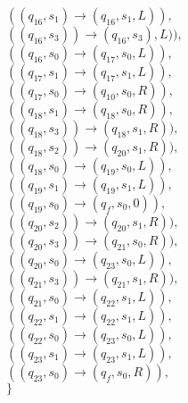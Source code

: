 \documentclass{article} %
\begin{document}
\begin{center}
\begin{varwidth}{\textwidth}
\begin{tasks}[label={},label-width={1cm}]
                \task
                $((q_{16}, s_{1}) \to (q_{16}, s_{1}, L)),$\\
                $((q_{16}, s_{3})) \to (q_{16}, s_{3}), L)),$\\
                $((q_{16}, s_{0}) \to (q_{17}, s_{0}, L)),$\\
                $((q_{17}, s_{1}) \to (q_{17}, s_{1}, L)),$\\
                $((q_{17}, s_{0}) \to (q_{10}, s_{0}, R)),$\\
                $((q_{18}, s_{1}) \to (q_{18}, s_{0}, R)),$\\
                $((q_{18}, s_{3})) \to (q_{18}, s_{1}, R)),$\\
                $((q_{18}, s_{2})) \to (q_{20}, s_{1}, R)),$\\
                $((q_{18}, s_{0}) \to (q_{19}, s_{0}, L)),$\\
                $((q_{19}, s_{1}) \to (q_{19}, s_{1}, L)),$\\
                $((q_{19}, s_{0}) \to (q_{f}, s_{0}, 0)),$\\
                $((q_{20}, s_{2})) \to (q_{20}, s_{1}, R)),$\\
                $((q_{20}, s_{3})) \to (q_{21}, s_{0}, R)),$\\
                $((q_{20}, s_{0}) \to (q_{23}, s_{0}, L)),$\\
                $((q_{21}, s_{3})) \to (q_{21}, s_{1}, R)),$\\
                $((q_{21}, s_{0}) \to (q_{22}, s_{1}, L)),$\\
                $((q_{22}, s_{1}) \to (q_{22}, s_{1}, L)),$\\
                $((q_{22}, s_{0}) \to (q_{23}, s_{0}, L)),$\\
                $((q_{23}, s_{1}) \to (q_{23}, s_{1}, L)),$\\
                $((q_{23}, s_{0}) \to (q_{f}, s_{0}, R)),$\\
                $\}$
            \end{tasks}
            \end{varwidth}
        \end{center}
\end{document}
